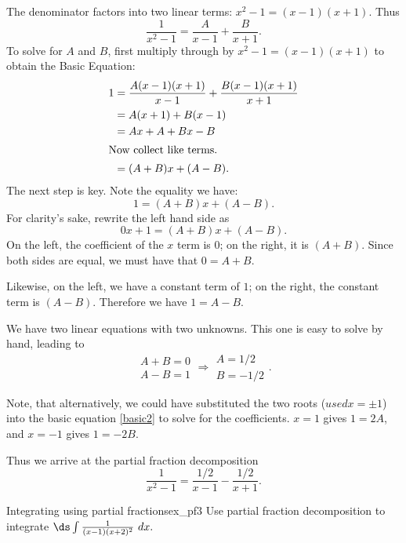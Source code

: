 \begin{solution}
{The denominator factors into two linear terms: $x^2-1 = (x-1)(x+1)$. Thus 
$$\frac{1}{x^2-1} = \frac{A}{x-1} + \frac{B}{x+1}.$$
To solve for $A$ and $B$, first multiply through by $x^2-1 = (x-1)(x+1)$ to obtain the Basic Equation:
\begin{align} 
1 &= \frac{A(x-1)(x+1)}{x-1}+\frac{B(x-1)(x+1)}{x+1} \\
	&= A(x+1) + B(x-1)  \label{basic2} \\
	&= Ax+A + Bx-B \\
	\intertext{Now collect like terms.}
	&= (A+B)x + (A-B).
\end{align}
The next step is key. Note the equality we have:
$$1 = (A+B)x+(A-B).$$
For clarity's sake, rewrite the left hand side as
$$0x+1 = (A+B)x+(A-B).$$
On the left, the coefficient of the $x$ term is $ 0 $; on the right, it is $(A+B)$. Since both sides are equal, we must have that $0=A+B$. 

Likewise, on the left, we have a constant term of $ 1 $; on the right, the constant term is $(A-B)$. Therefore we have $1=A-B$.

We have two linear equations with two unknowns. This one is easy to solve by hand, leading to 
$$\begin{array}{c} A+B = 0 \\ A-B = 1 \end{array} \Rightarrow \begin{array}{c} A=1/2 \\ B = -1/2\end{array}.$$

Note, that alternatively, we could have substituted the two roots ($ usedx=\pm 1 $) into the basic equation \ref{basic2} to solve for the coefficients. $ x=1 $ gives $ 1= 2A$, and $ x=-1 $ gives $ 1=-2B $. 

Thus we arrive at the partial fraction decomposition $$\frac{1}{x^2-1} = \frac{1/2}{x-1}-\frac{1/2}{x+1}.$$
}
\end{solution}









\begin{example}{Integrating using partial fractions}{ex_pf3}
Use partial fraction decomposition to integrate $\ds\int\frac{1}{(x-1)(x+2)^2}\ dx.$
\end{example}

